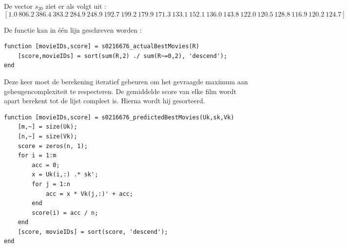

De vector $s_{20}$ ziet er als volgt uit :
$$[1.0\ 806.2\ 386.4\ 383.2\ 284.9\ 248.9\ 192.7\ 199.2\ 179.9\ 171.3\ 133.1\ 152.1\ 136.0\ 143.8\ 122.0\ 120.5\ 128.8\ 116.9\ 120.2\ 124.7]$$



De functie kan in \'e\'en lijn geschreven worden :

\begin{lstlisting}
function [movieIDs,score] = s0216676_actualBestMovies(R)
    [score,movieIDs] = sort(sum(R,2) ./ sum(R~=0,2), 'descend');
end
\end{lstlisting}



Deze keer moet de berekening iteratief gebeuren om het gevraagde maximum aan geheugencomplexiteit te respecteren. De gemiddelde score van elke film wordt apart berekent tot de lijst compleet is. Hierna wordt hij gesorteerd.

\begin{lstlisting}
function [movieIDs,score] = s0216676_predictedBestMovies(Uk,sk,Vk)
    [m,~] = size(Uk); 
    [n,~] = size(Vk);
    score = zeros(n, 1);
    for i = 1:m
        acc = 0;
        x = Uk(i,:) .* sk';
        for j = 1:n
            acc = x * Vk(j,:)' + acc;
        end
        score(i) = acc / n;
    end
    [score, movieIDs] = sort(score, 'descend');
end
\end{lstlisting}


\thispagestyle{empty}

